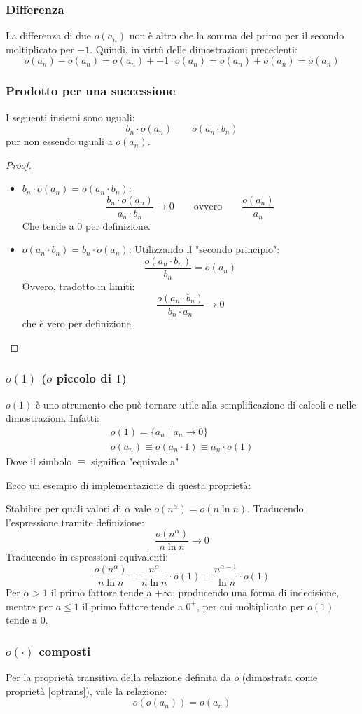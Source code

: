 \subsubsection{Differenza}
La differenza di due $o(a_n)$ non è altro che la somma del primo per il secondo moltiplicato per $-1$. Quindi, in virtù delle dimostrazioni precedenti:
\[
	o(a_n)-o(a_n)=o(a_n)+-1\cdot o(a_n)=o(a_n)+o(a_n)=o(a_n)
\]

\subsubsection{Prodotto per una successione}
I seguenti insiemi sono uguali:
\[
	b_n\cdot o(a_n)\qquad o(a_n\cdot b_n)
\]
pur non essendo uguali a $o(a_n)$.
\begin{proof} ~
	\begin{itemize}
		\item $b_n\cdot o(a_n)=o(a_n\cdot b_n)$:
		      \[
			      \frac{b_n\cdot o(a_n)}{a_n\cdot b_n}\to0\qquad\text{ovvero}\qquad\frac{o(a_n)}{a_n}
		      \]
		      Che tende a $0$ per definizione.
		\item $o(a_n\cdot b_n)=b_n\cdot o(a_n)$:
		      Utilizzando il "secondo principio":
		      \[
			      \frac{o(a_n\cdot b_n)}{b_n}=o(a_n)
		      \]
		      Ovvero, tradotto in limiti:
		      \[
			      \frac{o(a_n\cdot b_n)}{b_n\cdot a_n}\to0
		      \]
		      che è vero per definizione.
	\end{itemize}
\end{proof}

\subsubsection{$o(1)$ ($o$ piccolo di $1$)}
$o(1)$ è uno strumento che può tornare utile alla semplificazione di calcoli e nelle dimostrazioni. Infatti:
\begin{gather*}
	o(1)=\{a_n\mid a_n\to0\}\\
	o(a_n)\equiv o(a_n\cdot 1)\equiv a_n\cdot o(1)
\end{gather*}
Dove il simbolo $\equiv$ significa "equivale a"

Ecco un esempio di implementazione di questa proprietà:
\begin{examp}
	Stabilire per quali valori di $\alpha$ vale $o(n^\alpha)=o(n \ln n)$. Traducendo l'espressione tramite definizione:
	\[
		\frac{o(n^\alpha)}{n\ln n}\to0
	\]
	Traducendo in espressioni equivalenti:
	\[
		\frac{o(n^\alpha)}{n\ln n}\equiv\frac{n^\alpha}{n\ln n}\cdot o(1)\equiv\frac{n^{\alpha-1}}{\ln n}\cdot o(1)
	\]
	Per $\alpha>1$ il primo fattore tende a $+\infty$, producendo una forma di indecisione, mentre per $a\leq1$ il primo fattore tende a $0^+$, per cui moltiplicato per $o(1)$ tende a $0$.
\end{examp}

\subsubsection{$o(\cdot)$ composti}
Per la proprietà transitiva della relazione definita da $o$ (dimostrata come proprietà \vref{optrans}), vale la relazione:
\[
	o(o(a_n))=o(a_n)
\]

